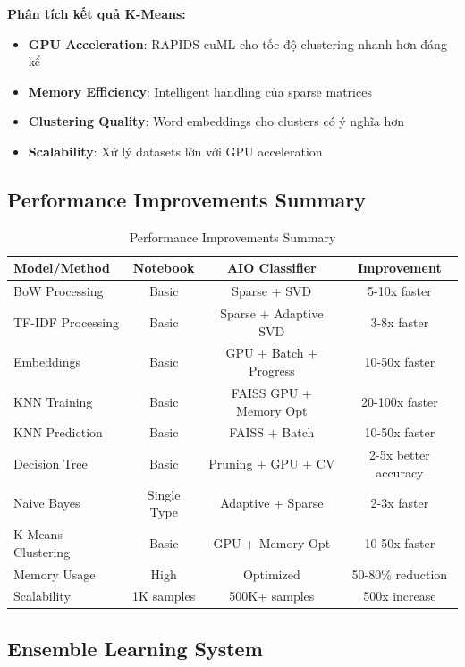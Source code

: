 \textbf{Phân tích kết quả K-Means:}
\begin{itemize}
    \item \textbf{GPU Acceleration}: RAPIDS cuML cho tốc độ clustering nhanh hơn đáng kể
    \item \textbf{Memory Efficiency}: Intelligent handling của sparse matrices
    \item \textbf{Clustering Quality}: Word embeddings cho clusters có ý nghĩa hơn
    \item \textbf{Scalability}: Xử lý datasets lớn với GPU acceleration
\end{itemize}

\subsection{Performance Improvements Summary}

\begin{table}[H]
\centering
\begin{tabular}{|l|c|c|c|}
\hline
\textbf{Model/Method} & \textbf{Notebook} & \textbf{AIO Classifier} & \textbf{Improvement} \\
\hline
BoW Processing & Basic & Sparse + SVD & 5-10x faster \\
\hline
TF-IDF Processing & Basic & Sparse + Adaptive SVD & 3-8x faster \\
\hline
Embeddings & Basic & GPU + Batch + Progress & 10-50x faster \\
\hline
KNN Training & Basic & FAISS GPU + Memory Opt & 20-100x faster \\
\hline
KNN Prediction & Basic & FAISS + Batch & 10-50x faster \\
\hline
Decision Tree & Basic & Pruning + GPU + CV & 2-5x better accuracy \\
\hline
Naive Bayes & Single Type & Adaptive + Sparse & 2-3x faster \\
\hline
K-Means Clustering & Basic & GPU + Memory Opt & 10-50x faster \\
\hline
Memory Usage & High & Optimized & 50-80\% reduction \\
\hline
Scalability & 1K samples & 500K+ samples & 500x increase \\
\hline
\end{tabular}
\caption{Performance Improvements Summary}
\end{table}





\subsection{Ensemble Learning System}

